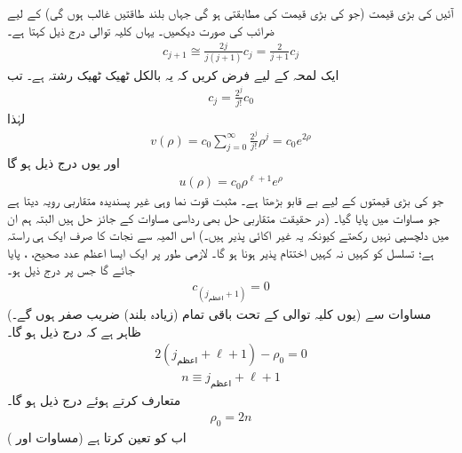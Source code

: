  آئیں  کی بڑی قیمت (جو  کی بڑی قیمت کی مطابقتی ہو گی جہاں بلند طاقتیں غالب ہوں گی) کے لیے ضرائب  کی صورت دیکھیں۔ یہاں کلیہ توالی درج ذیل کہتا ہے۔
\begin{align*}
c_{j+1}\cong\frac{2j}{j(j+1)}c_{j}=\frac{2}{j+1}c_{j} 
\end{align*}
ایک لمحہ کے لیے فرض کریں کہ یہ بالکل ٹھیک ٹھیک رشتہ ہے۔ تب 
\begin{align}
c_{j}=\frac{2^{j}}{j!}c_{0} 
\end{align}
لہٰذا
\begin{align*}
v(\rho)=c_{0}\sum_{j=0}^{\infty}\frac{2^{j}}{j!}\rho^{j}=c_{0}e^{2\rho} 
\end{align*}
 اور یوں درج ذیل ہو گا
\begin{align}
u(\rho)=c_{0}\rho^{\ell+1}e^{\rho} 
\end{align}
 جو  کی بڑی قیمتوں کے لیے بے قابو بڑھتا ہے۔ مثبت قوت نما وہی غیر پسندیدہ متقاربی رویہ دیتا ہے جو مساوات  میں پایا گیا۔ (در حقیقت متقاربی حل بھی رداسی مساوات کے جائز حل ہیں البتہ ہم ان میں دلچسپی نہیں رکھتے کیونکہ یہ غیر اکائی پذیر ہیں۔) اس المیہ سے نجات کا صرف ایک ہی راستہ ہے؛ تسلسل کو کہیں نہ کہیں اختتام پذیر ہونا ہو گا۔ لازمی طور پر ایک ایسا اعظم عدد صحیح، ، پایا جائے گا جس پر درج ذیل ہو۔
 \begin{align}
c_{(j_{\text{اعظم}}+1)}=0
\end{align}
 (یوں کلیہ توالی کے تحت باقی تمام (زیادہ بلند)  ضریب  صفر ہوں گے۔) مساوات  سے ظاہر ہے کہ درج ذیل ہو گا۔
 \begin{align*}
2(j_{\text{اعظم}}+\ell+1)-\rho_{0}=0 
\end{align*}
 \begin{align}\label{مساوات_ابعادی_صدر_کوانٹائی_عدد}
n\equiv j_{\text{اعظم}}+\ell+1 
\end{align}
 متعارف کرتے ہوئے درج ذیل ہو گا۔
 \begin{align}\label{مساوات_ابعادی_رو_این}
\rho_{0}=2n 
\end{align}
 اب  کو  تعین کرتا ہے (مساوات  اور )
